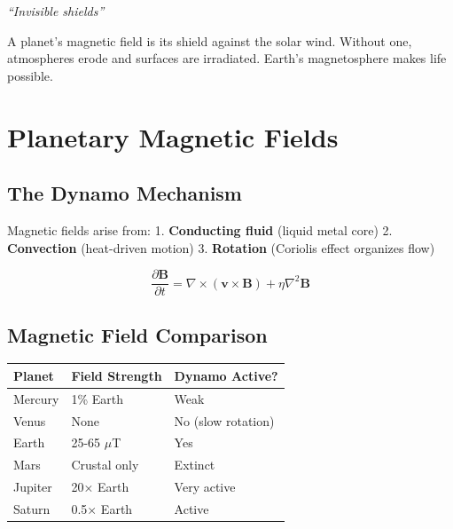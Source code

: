 \documentclass[
  11pt,
  letterpaper,
  twoside,
  openright]{book}
\begin{document}
\emph{``Invisible shields''}

\begin{tcolorbox}[enhanced jigsaw, leftrule=.75mm, title=\textcolor{quarto-callout-note-color}{\faInfo}\hspace{0.5em}{Key Revelation}, bottomrule=.15mm, opacityback=0, coltitle=black, arc=.35mm, colframe=quarto-callout-note-color-frame, colbacktitle=quarto-callout-note-color!10!white, colback=white, titlerule=0mm, breakable, bottomtitle=1mm, toptitle=1mm, rightrule=.15mm, toprule=.15mm, left=2mm, opacitybacktitle=0.6]

A planet's magnetic field is its shield against the solar wind. Without
one, atmospheres erode and surfaces are irradiated. Earth's
magnetosphere makes life possible.

\end{tcolorbox}

\section{Planetary Magnetic Fields}\label{planetary-magnetic-fields}

\subsection{The Dynamo Mechanism}\label{the-dynamo-mechanism}

Magnetic fields arise from: 1. \textbf{Conducting fluid} (liquid metal
core) 2. \textbf{Convection} (heat-driven motion) 3. \textbf{Rotation}
(Coriolis effect organizes flow)

\[
\frac{\partial \mathbf{B}}{\partial t} = \nabla \times (\mathbf{v} \times \mathbf{B}) + \eta \nabla^2 \mathbf{B}
\]

\subsection{Magnetic Field Comparison}\label{magnetic-field-comparison}

\begin{longtable}[]{@{}lll@{}}
\toprule\noalign{}
Planet & Field Strength & Dynamo Active? \\
\midrule\noalign{}
\endhead
\bottomrule\noalign{}
\endlastfoot
Mercury & 1\% Earth & Weak \\
Venus & None & No (slow rotation) \\
Earth & 25-65 \(\mu\)T & Yes \\
Mars & Crustal only & Extinct \\
Jupiter & 20× Earth & Very active \\
Saturn & 0.5× Earth & Active \\
\end{longtable}
\end{document}
